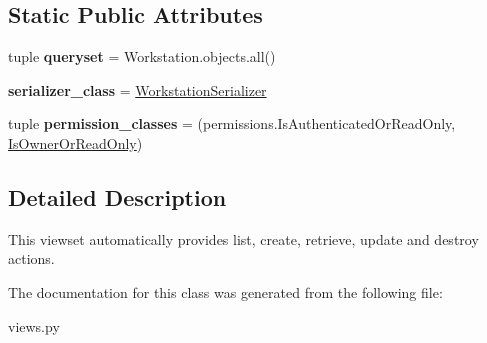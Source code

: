\subsection*{Static Public Attributes}
\begin{DoxyCompactItemize}
\item 
\hypertarget{classrestriction__system_1_1views_1_1WorkstationViewSet_a526a9fd1612c4f33312bb92b32a727bd}{}tuple {\bfseries queryset} = Workstation.\+objects.\+all()\label{classrestriction__system_1_1views_1_1WorkstationViewSet_a526a9fd1612c4f33312bb92b32a727bd}

\item 
\hypertarget{classrestriction__system_1_1views_1_1WorkstationViewSet_aa4958d8892d9daffcf72ad5e5828d7ef}{}{\bfseries serializer\+\_\+class} = \hyperlink{classrestriction__system_1_1serializers_1_1WorkstationSerializer}{Workstation\+Serializer}\label{classrestriction__system_1_1views_1_1WorkstationViewSet_aa4958d8892d9daffcf72ad5e5828d7ef}

\item 
\hypertarget{classrestriction__system_1_1views_1_1WorkstationViewSet_a7d49f1286d795ef220ffeba1becf8363}{}tuple {\bfseries permission\+\_\+classes} = (permissions.\+Is\+Authenticated\+Or\+Read\+Only, \hyperlink{classrestriction__system_1_1permissions_1_1IsOwnerOrReadOnly}{Is\+Owner\+Or\+Read\+Only})\label{classrestriction__system_1_1views_1_1WorkstationViewSet_a7d49f1286d795ef220ffeba1becf8363}

\end{DoxyCompactItemize}


\subsection{Detailed Description}
This viewset automatically provides {\ttfamily list}, {\ttfamily create}, {\ttfamily retrieve}, {\ttfamily update} and {\ttfamily destroy} actions. 



The documentation for this class was generated from the following file\+:\begin{DoxyCompactItemize}
\item 
views.\+py\end{DoxyCompactItemize}
